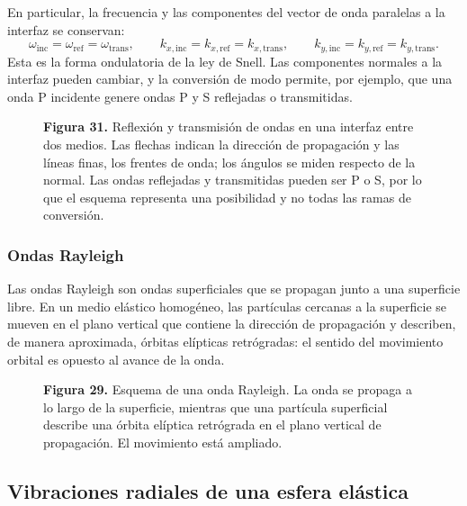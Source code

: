 En particular, la frecuencia y las componentes del vector de onda paralelas a la interfaz se conservan:
\[
\omega_{\mathrm{inc}}=\omega_{\mathrm{ref}}=\omega_{\mathrm{trans}},
\qquad
k_{x,\mathrm{inc}}=k_{x,\mathrm{ref}}=k_{x,\mathrm{trans}},
\qquad
k_{y,\mathrm{inc}}=k_{y,\mathrm{ref}}=k_{y,\mathrm{trans}}.
\]
Esta es la forma ondulatoria de la ley de Snell. Las componentes normales a la interfaz pueden cambiar, y la conversión de modo permite, por ejemplo, que una onda P incidente genere ondas P y S reflejadas o transmitidas.

\begin{figure}[H]
\centering

\par\medskip
\textbf{Figura 31.} Reflexión y transmisión de ondas en una interfaz entre dos medios. Las flechas indican la dirección de propagación y las líneas finas, los frentes de onda; los ángulos se miden respecto de la normal. Las ondas reflejadas y transmitidas pueden ser P o S, por lo que el esquema representa una posibilidad y no todas las ramas de conversión.
\end{figure}

\subsubsection{Ondas Rayleigh}

Las ondas Rayleigh son ondas superficiales que se propagan junto a una superficie libre. En un medio elástico homogéneo, las partículas cercanas a la superficie se mueven en el plano vertical que contiene la dirección de propagación y describen, de manera aproximada, órbitas elípticas retrógradas: el sentido del movimiento orbital es opuesto al avance de la onda.

\begin{figure}[H]
\centering

\par\medskip
\textbf{Figura 29.} Esquema de una onda Rayleigh. La onda se propaga a lo largo de la superficie, mientras que una partícula superficial describe una órbita elíptica retrógrada en el plano vertical de propagación. El movimiento está ampliado.
\end{figure}

\subsection{Vibraciones radiales de una esfera elástica}

